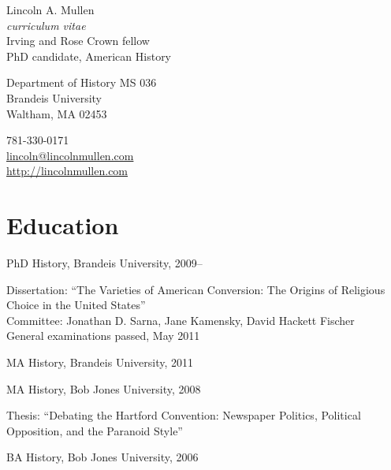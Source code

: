 \documentclass[11pt]{article}
\begin{document}
{\LARGE Lincoln A. Mullen}\\
\emph{curriculum vitae}\\[0.5cm]

Irving and Rose Crown fellow\\
PhD candidate, American History

\begin{multicols}{2}
  Department of History MS 036\\
  Brandeis University\\
  Waltham, MA 02453

  \columnbreak

  781-330-0171\\
  \href{mailto:lincoln@lincolnmullen.com}{lincoln@lincolnmullen.com}\\
  \href{http://lincolnmullen.com}{http://lincolnmullen.com}
\end{multicols}


\vskip 0.5cm


\section{Education}
PhD History, Brandeis University, 2009--

\begingroup
{}
Dissertation: ``The Varieties of American Conversion: The Origins of 
Religious Choice in the United States''\\[1pt]
Committee:  Jonathan D. Sarna, Jane Kamensky, David Hackett 
Fischer\\[1pt]
General examinations passed, May 2011
\par
\endgroup

MA History, Brandeis University, 2011

MA History, Bob Jones University, 2008

\begingroup
{}
Thesis: ``Debating the Hartford Convention: Newspaper Politics, Political 
Opposition, and the Paranoid Style''
\par
\endgroup

BA History, Bob Jones University, 2006

\end{document}
